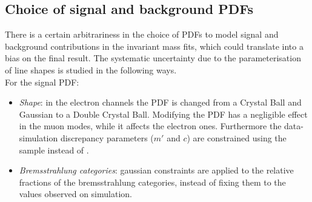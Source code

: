 \begin{table}[t!]
\begin{center}
\end{center}
\end{table}


\subsection{Choice of signal and background PDFs}

There is a certain arbitrariness in the choice of PDFs to model signal and background contributions in the
invariant mass fits, which could translate into a bias on the final result. The systematic uncertainty due to the
parameterisation of line shapes is studied in the following ways.
\\

For the signal PDF:
%
\begin{itemize}

\item \textit{Shape}: in the electron channels the PDF is changed from a Crystal Ball and Gaussian to a Double Crystal Ball.
Modifying the PDF has a negligible effect in the muon modes, while it affects the electron ones.
 Furthermore the data-simulation discrepancy parameters ($m'$ and $c$) are constrained using the
\BdToKstGee sample instead of \BdToKstJPsee.

\item \textit{Bremsstrahlung categories}: gaussian constraints are applied to the relative fractions of the bremsstrahlung
categories, instead of fixing them to the values observed on simulation.


\end{itemize}

